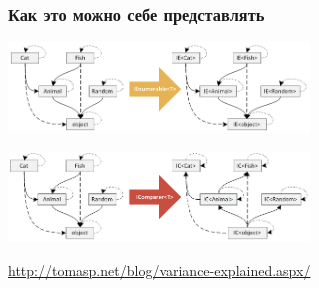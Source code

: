 \documentclass{../../slides-style}
\begin{document}
    \begin{frame}
        \frametitle{Как это можно себе представлять}
        \begin{center}
            \includegraphics[width=0.6\textwidth]{covariantFunctors.png}

            \vspace{4mm}
            \includegraphics[width=0.6\textwidth]{contravariantFunctors.png}
        \end{center}
            
        \url{http://tomasp.net/blog/variance-explained.aspx/}
    \end{frame}
\end{document}
